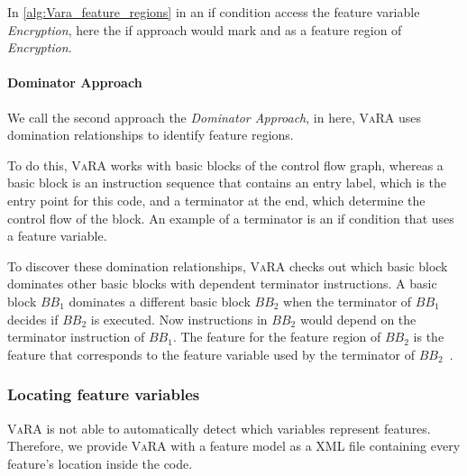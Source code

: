 In \autoref{alg:Vara_feature_regions} in  an if condition access the feature variable \emph{Encryption}, 
here the if approach would mark  and  as a feature region of \emph{Encryption}.

\paragraph{Dominator Approach}
We call the second approach the \emph{Dominator Approach}, in here, \textsc{VaRA} uses domination relationships to identify feature regions.

To do this, \textsc{VaRA} works with basic blocks of the control flow graph, whereas a basic block is an instruction sequence that contains an entry label, 
which is the entry point for this code, and a terminator at the end, which determine the control flow of the block. 
An example of a terminator is an if condition that uses a feature variable.

To discover these domination relationships, \textsc{VaRA} checks out which basic block dominates other basic blocks with dependent terminator instructions. 
A basic block $BB_1$ dominates a different basic block $BB_2$ when the terminator of $BB_1$ decides if $BB_2$ is executed. 
Now instructions in $BB_2$ would depend on the terminator instruction of $BB_1$. 
The feature for the feature region of $BB_2$ is the feature that corresponds to the feature variable used by the terminator of $BB_2$~\cite{VaRA-Tom}.


\subsubsection{Locating feature variables}
\textsc{VaRA} is not able to automatically detect which variables represent features. 
Therefore, we provide \textsc{VaRA} with a feature model as a \textsc{XML} file containing every feature's location inside the code.

